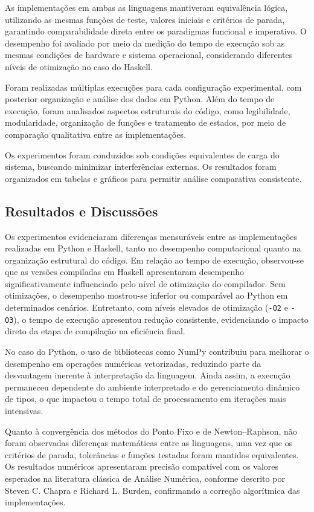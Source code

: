 As implementações em ambas as linguagens mantiveram equivalência lógica,
utilizando as mesmas funções de teste, valores iniciais e critérios de parada,
garantindo comparabilidade direta entre os paradigmas funcional e imperativo.
O desempenho foi avaliado por meio da medição do tempo de execução sob as
mesmas condições de hardware e sistema operacional, considerando diferentes
níveis de otimização no caso do Haskell.

Foram realizadas múltiplas execuções para cada configuração experimental, com
posterior organização e análise dos dados em Python. Além do tempo de execução,
foram analisados aspectos estruturais do código, como legibilidade,
modularidade, organização de funções e tratamento de estados, por meio de
comparação qualitativa entre as implementações.

Os experimentos foram conduzidos sob condições equivalentes de carga do
sistema, buscando minimizar interferências externas. Os resultados foram
organizados em tabelas e gráficos para permitir análise comparativa consistente.

\subsection{Resultados e Discussões}

Os experimentos evidenciaram diferenças mensuráveis entre as implementações
realizadas em Python e Haskell, tanto no desempenho computacional quanto na
organização estrutural do código. Em relação ao tempo de execução, observou-se
que as versões compiladas em Haskell apresentaram desempenho significativamente
influenciado pelo nível de otimização do compilador. Sem otimizações, o
desempenho mostrou-se inferior ou comparável ao Python em determinados
cenários. Entretanto, com níveis elevados de otimização
(\texttt{-O2} e \texttt{-O3}), o tempo de execução apresentou redução
consistente, evidenciando o impacto direto da etapa de compilação na eficiência
final.

No caso do Python, o uso de bibliotecas como NumPy contribuiu para melhorar o
desempenho em operações numéricas vetorizadas, reduzindo parte da desvantagem
inerente à interpretação da linguagem. Ainda assim, a execução permaneceu
dependente do ambiente interpretado e do gerenciamento dinâmico de tipos, o que
impactou o tempo total de processamento em iterações mais intensivas.

Quanto à convergência dos métodos do Ponto Fixo e de Newton--Raphson, não foram
observadas diferenças matemáticas entre as linguagens, uma vez que os critérios
de parada, tolerâncias e funções testadas foram mantidos equivalentes. Os
resultados numéricos apresentaram precisão compatível com os valores esperados
na literatura clássica de Análise Numérica, conforme descrito por Steven C.
Chapra e Richard L. Burden, confirmando a correção algorítmica das
implementações.

